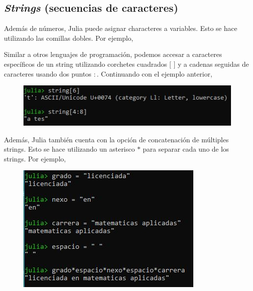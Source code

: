 \subsection{\textit{Strings} (secuencias de caracteres)} 

Además de números, Julia puede asignar characteres a variables. Esto se hace utilizando las comillas dobles. Por ejemplo,

\begin{tcolorbox}
\end{tcolorbox}

Similar a otros lenguajes de programación, podemos accesar a caracteres específicos de un string utilizando corchetes cuadrados $[$ $]$ y a cadenas seguidas de caracteres usando dos puntos $:$. Continuando con el ejemplo anterior, 

\begin{figure}[h]
\begin{center}
\includegraphics[scale=0.8]{Imagenes/ejemplo_string_partes.JPG}
  \label{ejemplo_string_julia_partes}
\end{center}
\end{figure}

Además, Julia también cuenta con la opción de concatenación de múltiples strings. Esto se hace utilizando un asterisco $*$ para separar cada uno de los strings. Por ejemplo,

\begin{figure}[h]
\begin{center}
\includegraphics[scale=0.8]{Imagenes/ejemplo_concatenacion.JPG}
  \label{ejemplo_string_concatenacion}
\end{center}
\end{figure}

